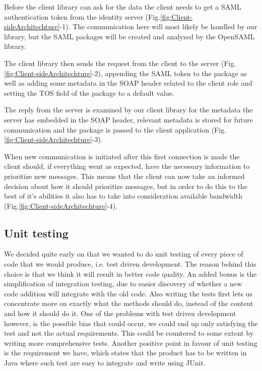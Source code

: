         Before the client library can ask for the data the client needs to get a SAML authentication token from the identity server (Fig.\ref{fig:Client-sideArchitechture}-1). The communication here will most likely be handled by our library, but the SAML packages will be created and analyzed by the OpenSAML library. 

        The client library then sends the request from the client to the server (Fig.\ref{fig:Client-sideArchitechture}-2), appending the SAML token to the package as well as adding some metadata in the SOAP header related to the client role and setting the TOS field of the package to a default value.

        The reply from the server is examined by our client library for the metadata the server has embedded in the SOAP header, relevant metadata is stored for future communication and the package is passed to the client application (Fig.\ref{fig:Client-sideArchitechture}-3).

        When new communication is initiated after this first connection is made the client should, if everything went as expected, have the necessary information to prioritize new messages. This means that the client can now take an informed decision about how it should prioritize messages, but in order to do this to the best of it’s abilities it also has to take into consideration available bandwidth (Fig.\ref{fig:Client-sideArchitechture}-4).
    
    \subsection{Unit testing}\label{Unit testing}
    We decided quite early on that we wanted to do unit testing of every piece of code that we would produce, i.e. test driven development. The reason behind this choice is that we think it will result in better code quality. An added bonus is the simplification of integration testing, due to easier discovery of whether a new code addition will integrate with the old code. Also writing the tests first lets us concentrate more on exactly what the methods should do, instead of the content and how it should do it. One of the problems with test driven development however, is the possible bias that could occur, we could end up only satisfying the test and not the actual requirements. This could be countered to some extent by writing more comprehensive tests. Another positive point in favour of unit testing is the requirement we have, which states that the product has to be written in Java where such test are easy to integrate and write using JUnit.

